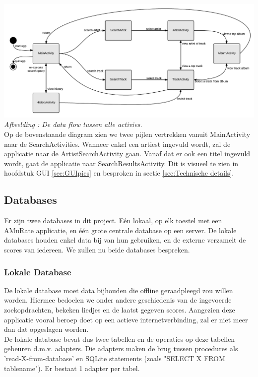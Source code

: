 \documentclass[11pt,a4paper]{article}
\newcounter{figc}
\newcommand{\figID} {%
   \stepcounter{figc}%
   \thefigc}
\begin{document}
	\includegraphics[scale=1.1]{Pictures/Dataflow2.png} \newline
	\small \textit{Afbeelding \figID : De data flow tussen alle activies.} \\ \normalsize \newline
	Op de bovenstaande diagram zien we twee pijlen vertrekken vanuit MainActivity naar de SearchActivities. Wanneer enkel een artiest ingevuld wordt, zal de applicatie naar de ArtistSearchActivity gaan. Vanaf dat er ook een titel ingevuld wordt, gaat de applicatie naar SearchResultsActivity. Dit is visueel te zien in hoofdstuk GUI \ref{sec:GUIpics} en besproken in sectie \ref{sec:Technische details}.
	
	\subsection{Databases}
	\label{sec:Databases}
	Er zijn twee databases in dit project. Eén lokaal, op elk toestel met een AMuRate applicatie, en één grote centrale database op een server. De lokale databases houden enkel data bij van hun gebruiken, en de externe verzamelt de scores van iedereen. We zullen nu beide databases bespreken.
	
	\subsubsection{Lokale Database}
	\label{sec:Lokale Database}
	De lokale database moet data bijhouden die offline geraadpleegd zou willen worden. Hiermee bedoelen we onder andere geschiedenis van de ingevoerde zoekopdrachten, bekeken liedjes en de laatst gegeven scores. Aangezien deze applicatie vooral beroep doet op een actieve internetverbinding, zal er niet meer dan dat opgeslagen worden. \\ \newline \newpage
	De lokale database bevat dus twee tabellen en de operaties op deze tabellen gebeuren d.m.v. adapters. Die adapters maken de brug tussen procedures als 'read-X-from-database' en SQLite statements (zoals "SELECT X FROM tablename"). Er bestaat 1 adapter per tabel. \newline
	 
\end{document}
